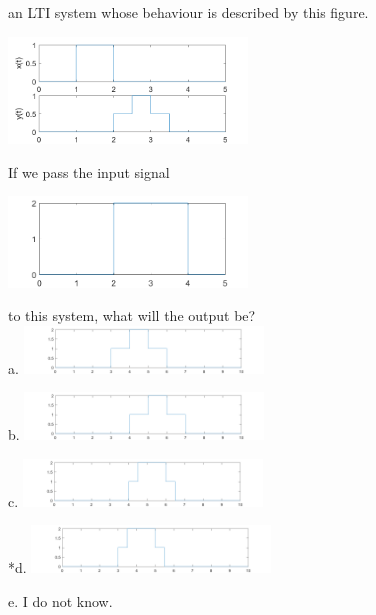 
an LTI system whose behaviour is described by this figure. 

\includegraphics[width=2.5in]{../../Images/LTISystemsQ51.png}
 
If we pass the input signal 

\includegraphics[width=2.5in]{../../Images/LTISystemsQ52.png}

to this system, what will the output be?\\

a.
\includegraphics[width=2.5in]{../../Images/LTISystemsQ5a.png}

b. 
\includegraphics[width=2.5in]{../../Images/LTISystemsQ5b.png} 

c. 
\includegraphics[width=2.5in]{../../Images/LTISystemsQ5c.png}

*d. 
\includegraphics[width=2.5in]{../../Images/LTISystemsQ5d.png}

e. I do not know.\\
